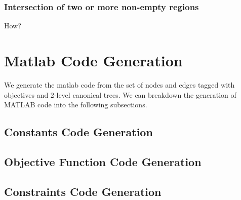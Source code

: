 \documentclass[letterpaper, 10 pt, conference]{ieeeconf}  %
\begin{document}
\subsubsection{Intersection of two or more non-empty regions}
How?

\section{Matlab Code Generation}
We generate the matlab code from the set of nodes and edges tagged with objectives and 2-level canonical trees. We can breakdown the generation of MATLAB code into the following subsections.

\subsection{Constants Code Generation} 
\subsection{Objective Function Code Generation} 
\subsection{Constraints Code Generation}




\end{document}
